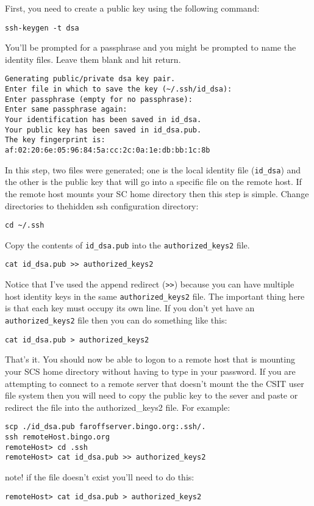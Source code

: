 \documentclass[12pt,a4paper]{article}
\begin{document}
First, you need to create a public key using the following command:
\begin{verbatim}
ssh-keygen -t dsa
\end{verbatim}
You'll be prompted for a passphrase and you might be prompted to name the identity files. Leave them blank and hit return.
\begin{verbatim}
Generating public/private dsa key pair.
Enter file in which to save the key (~/.ssh/id_dsa):
Enter passphrase (empty for no passphrase):
Enter same passphrase again:
Your identification has been saved in id_dsa.
Your public key has been saved in id_dsa.pub.
The key fingerprint is:
af:02:20:6e:05:96:84:5a:cc:2c:0a:1e:db:bb:1c:8b
\end{verbatim}
In this step, two files were generated; one is the local identity file (\texttt{id\_dsa}) and the other is the public key that will go into a specific file on the remote host. If the remote host mounts your SC home directory then this step is simple. Change directories to thehidden ssh configuration directory:
\begin{verbatim}
cd ~/.ssh
\end{verbatim}
Copy the contents of \texttt{id\_dsa.pub} into the \texttt{authorized\_keys2} file.
\begin{verbatim}
cat id_dsa.pub >> authorized_keys2
\end{verbatim}
Notice that I've used the append redirect (\texttt{>>}) because you can have multiple host identity keys in the same \texttt{authorized\_keys2} file. The important thing here is that each key must occupy its own line. If you don't yet have an \texttt{authorized\_keys2} file then you can do something like this:
\begin{verbatim}
cat id_dsa.pub > authorized_keys2
\end{verbatim}
That's it. You should now be able to logon to a remote host that is mounting your SCS home directory without having to type in your password. If you are attempting to connect to a remote server that doesn't mount the the CSIT user file system then you will need to copy the public key to the sever and paste or redirect the file into the authorized\_keys2 file. For example:
\begin{verbatim}
scp ./id_dsa.pub faroffserver.bingo.org:.ssh/.
ssh remoteHost.bingo.org
remoteHost> cd .ssh
remoteHost> cat id_dsa.pub >> authorized_keys2
\end{verbatim}
note! if the file doesn't exist you'll need to do this:
\begin{verbatim}
remoteHost> cat id_dsa.pub > authorized_keys2
\end{verbatim}
\end{document}
